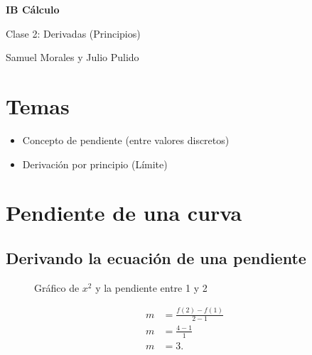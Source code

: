 \documentclass[spanish,12pt]{article}
\begin{document}
	\begin{titlepage}
	\begin{center}
	\hspace{0pt}
	\vfill
	{\Large\textbf{{IB Cálculo}}}
	
	\medskip
	Clase 2: Derivadas (Principios)
	
	\medskip
    Samuel Morales y Julio Pulido
	
	\thispagestyle{empty}
	\vfill
	\end{center}
	\end{titlepage}
\newpage
\tableofcontents
\newpage
\section{Temas}
\begin{itemize}
    \item Concepto de pendiente (entre valores discretos)
    \item Derivación por principio (Límite) 
\end{itemize}
\section{Pendiente de una curva}
\subsection{Derivando la ecuación de una pendiente}
\begin{figure}[h]
		\begin{center}
	\caption{Gráfico de $x^2$ y la pendiente entre 1 y 2}
	\end{center}
	\end{figure}
	
	\begin{align*}
	m&=\frac{f(2)-f(1)}{2-1}\\
	m&=\frac{4-1}{1}\\
	m&=3.
	\end{align*}
\end{document}
